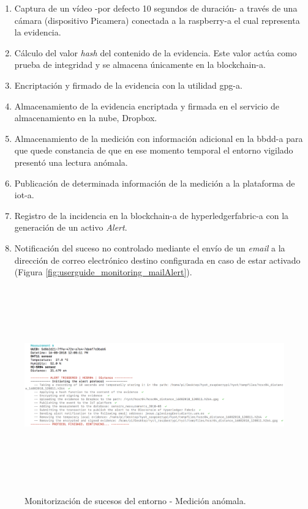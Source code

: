 \documentclass[12pt,a4paper, twoside]{report}
\begin{document}
\begin{itemize}
	 	 	\begin{enumerate}
				\item Captura de un vídeo -por defecto 10 segundos de duración- a través de una cámara (dispositivo Picamera) conectada a la \gls{raspberry-a} el cual representa la evidencia.
				\item Cálculo del valor \textit{hash} del contenido de la evidencia. Este valor actúa como prueba de integridad y se almacena únicamente en la \gls{blockchain-a}. 
				\item Encriptación y firmado de la evidencia con la utilidad \gls{gpg-a}.
				\item Almacenamiento de la evidencia encriptada y firmada en el servicio de almacenamiento en la nube, Dropbox.
				\item Almacenamiento de la medición con información adicional en la \gls{bbdd-a} para que quede constancia de que en ese momento temporal el entorno vigilado presentó una lectura anómala.				
				\item Publicación de determinada información de la medición a la plataforma de \gls{iot-a}.
				\item Registro de la incidencia	en la \gls{blockchain-a} de \gls{hyperledgerfabric-a} con la generación de un activo \textit{Alert}. 		
				\item Notificación del suceso no controlado mediante el envío de un \textit{email} a la dirección de correo electrónico destino configurada en caso de estar activado (Figura \ref{fig:userguide_monitoring_mailAlert}).
			\end{enumerate}
			
			\begin{figure}[!ht]   
				\caption{Monitorización de sucesos del entorno - Medición anómala.} 
				\begin{center} 
					\includegraphics[width=17cm,height=8.5cm]{Images/userGuide/monitoring/measurementAlert} \\
					\label{fig:userguide_monitoring_measurementAlert} 
				\end{center}  
			\end{figure}	 
		
	 \end{itemize}
	 
\end{document}
